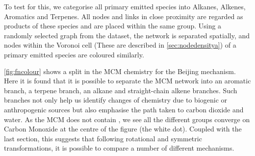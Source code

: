 To test for this, we categorise all primary emitted species into Alkanes, Alkenes, Aromatics and Terpenes. All nodes and links in close proximity are regarded as products of these species and are placed within the same group. Using a randomly selected graph from the dataset, the network is separated spatially, and nodes within the Voronoi cell (These are described in \autoref{sec:nodedensitya}) of a primary emitted species are coloured similarly.  

\autoref{fig:fncolour} shows a split in the MCM chemistry for the Beijing mechanism. Here it is found that it is possible to separate the MCM network into an aromatic branch, a terpene branch, an alkane and straight-chain alkene branches. Such branches not only help us identify changes of chemistry due to biogenic or anthropogenic sources but also emphasise the path taken to carbon dioxide and water. As the MCM does not contain , we see all the different groups converge on Carbon Monoxide at the centre of the figure (the white dot). Coupled with the last section, this suggests that following rotational and symmetric transformations, it is possible to compare a number of different mechanisms.
 
